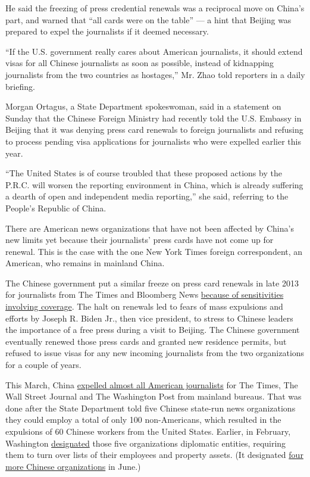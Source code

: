 He said the freezing of press credential renewals was a reciprocal move
on China's part, and warned that ``all cards were on the table'' --- a
hint that Beijing was prepared to expel the journalists if it deemed
necessary.

``If the U.S. government really cares about American journalists, it
should extend visas for all Chinese journalists as soon as possible,
instead of kidnapping journalists from the two countries as hostages,''
Mr. Zhao told reporters in a daily briefing.

Morgan Ortagus, a State Department spokeswoman, said in a statement on
Sunday that the Chinese Foreign Ministry had recently told the U.S.
Embassy in Beijing that it was denying press card renewals to foreign
journalists and refusing to process pending visa applications for
journalists who were expelled earlier this year.

``The United States is of course troubled that these proposed actions by
the P.R.C. will worsen the reporting environment in China, which is
already suffering a dearth of open and independent media reporting,''
she said, referring to the People's Republic of China.

There are American news organizations that have not been affected by
China's new limits yet because their journalists' press cards have not
come up for renewal. This is the case with the one New York Times
foreign correspondent, an American, who remains in mainland China.

The Chinese government put a similar freeze on press card renewals in
late 2013 for journalists from The Times and Bloomberg News
\href{https://www.nytimes3xbfgragh.onion/2013/11/09/world/asia/bloomberg-news-is-said-to-curb-articles-that-might-anger-china.html}{because
of sensitivities involving coverage}. The halt on renewals led to fears
of mass expulsions and efforts by Joseph R. Biden Jr., then vice
president, to stress to Chinese leaders the importance of a free press
during a visit to Beijing. The Chinese government eventually renewed
those press cards and granted new residence permits, but refused to
issue visas for any new incoming journalists from the two organizations
for a couple of years.

This March, China
\href{https://www.nytimes3xbfgragh.onion/2020/03/17/business/media/china-expels-american-journalists.html}{expelled
almost all American journalists} for The Times, The Wall Street Journal
and The Washington Post from mainland bureaus. That was done after the
State Department told five Chinese state-run news organizations they
could employ a total of only 100 non-Americans, which resulted in the
expulsions of 60 Chinese workers from the United States. Earlier, in
February, Washington
\href{https://www.nytimes3xbfgragh.onion/2020/02/18/world/asia/china-media-trump.html}{designated}
those five organizations diplomatic entities, requiring them to turn
over lists of their employees and property assets. (It designated
\href{https://www.nytimes3xbfgragh.onion/2020/06/22/us/politics/us-china-news-organizations.html}{four
more Chinese organizations} in June.)

